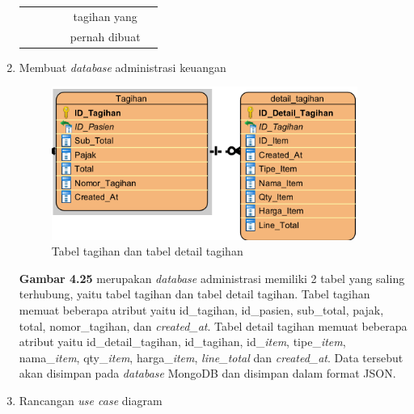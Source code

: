 \begin{enumerate}
\begin{table}[H]
\begin{tabular}{|c|c|c|c|c|c|}
			& 
			&
			&
			&
			tagihan yang&
			\\
			
			& 
			&
			&
			&
			pernah dibuat&
			\\
			\hline
			
		\end{tabular}
	\end{table}
	
	\item Membuat \emph{database} administrasi keuangan
	
	\begin{figure}[H]
		\centering
		\includegraphics[width=10cm]{gambar/tagihan_database.png}
		\caption{Tabel tagihan dan tabel detail tagihan} 
		\label{Gambar:usecaseadminjurnalpertama}
	\end{figure}
	
	\textbf{Gambar 4.25} merupakan \emph{database} administrasi memiliki 2 tabel yang saling terhubung, yaitu tabel tagihan dan tabel detail tagihan. Tabel tagihan memuat beberapa atribut yaitu id\_tagihan, id\_pasien, sub\_total, pajak, total, nomor\_tagihan, dan \emph{created\_at}. Tabel detail tagihan memuat beberapa atribut yaitu id\_detail\_tagihan, id\_tagihan, id\_\emph{item}, tipe\_\emph{item}, nama\_\emph{item}, qty\_\emph{item}, harga\_\emph{item}, \emph{line\_total} dan \emph{created\_at}. Data tersebut akan disimpan pada \emph{database} MongoDB dan disimpan dalam format JSON.
	
	\break
	\item Rancangan \emph{use case} diagram
	

\end{enumerate}
